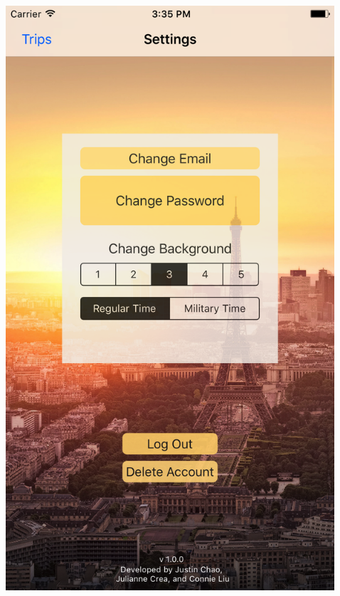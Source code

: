 \documentclass{beamer}
\begin{document}
\begin{frame}
\begin{columns}
\begin{column}{0.3\textwidth}
    \end{column}
    \begin{column}{0.3\textwidth}  %
        \begin{center}
            \includegraphics[scale=0.08]{settings2}
        \end{center}
    \end{column}
    \begin{column}{0.3\textwidth}  %
        \begin{center}

\end{center}
\end{column}
\end{columns}
\end{frame}
\end{document}
